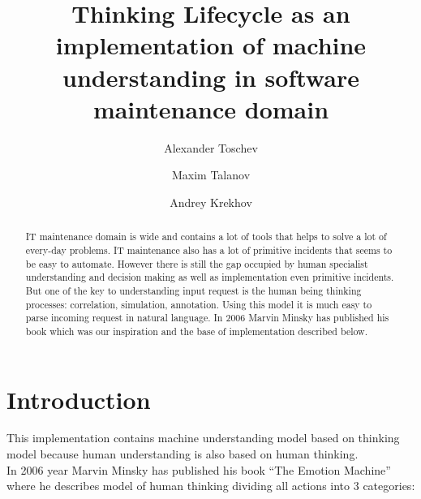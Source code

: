 \documentclass[runningheads,a4paper]{llncs}
\begin{document}
\mainmatter

\title{Thinking Lifecycle as an implementation of machine understanding in software maintenance domain}


\author{Alexander Toschev \and Maxim Talanov \and Andrey Krekhov}


\maketitle

\begin{abstract}
IT maintenance domain is wide and contains a lot of tools that helps to solve a lot of every-day problems. IT maintenance also has a lot of primitive incidents that seems to be easy to automate. However there is still the gap occupied by human specialist understanding and decision making as well as implementation even primitive incidents. But one of the key to understanding input request is the human being thinking processes: correlation, simulation, annotation. Using this model it is much easy to parse incoming request in natural language. In 2006 Marvin Minsky has published his book \cite{minsk} which was our inspiration and the base of implementation described below.


\end{abstract}

\section{Introduction}
This implementation contains machine understanding model based on thinking model because human understanding is also based on human thinking. \\
In 2006 year Marvin Minsky has published his book “The Emotion Machine” where he describes model of human thinking dividing all actions into 3 categories:
\end{document}
